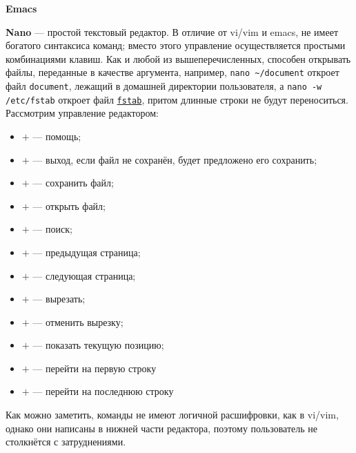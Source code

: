 \textbf{Emacs} %

\textbf{Nano} --- простой текстовый редактор. В отличие от vi/vim и emacs, не имеет богатого синтаксиса команд; вместо этого управление осуществляется простыми комбинациями клавиш. Как и любой из вышеперечисленных, способен открывать файлы, переданные в качестве аргумента, например, \texttt{nano \~{}/document} откроет файл \texttt{document}, лежащий в домашней директории пользователя, а \texttt{nano -w /etc/fstab} откроет файл \hyperref[fstab]{\texttt{fstab}}, притом длинные строки не будут переноситься.
Рассмотрим управление редактором:
\begin{itemize}
 \item \Ctrl$+$ --- помощь;
 \item \Ctrl$+$ --- выход, если файл не сохранён, будет предложено его сохранить;
 \item \Ctrl$+$ --- сохранить файл;
 \item \Ctrl$+$ --- открыть файл;
 \item \Ctrl$+$ --- поиск;
 \item \Ctrl$+$ --- предыдущая страница;
 \item \Ctrl$+$ --- следующая страница;
 \item \Ctrl$+$ --- вырезать;
 \item \Ctrl$+$ --- отменить вырезку;
 \item \Ctrl$+$ --- показать текущую позицию;
 \item \Alt$+$\keystroke{\textbackslash{}} --- перейти на первую строку
 \item \Alt$+$\keystroke{/} --- перейти на последнюю строку
\end{itemize}
Как можно заметить, команды не имеют логичной расшифровки, как в vi/vim, однако они написаны в нижней части редактора, поэтому пользователь не столкнётся с затруднениями.

